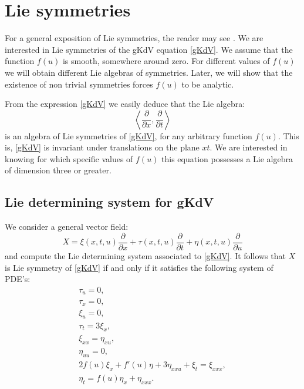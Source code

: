 \documentclass[
11pt,%
tightenlines,%
twoside,%
onecolumn,%
nofloats,%
nobibnotes,%
nofootinbib,%
superscriptaddress,%
noshowpacs,%
centertags]%
{revtex4}
\begin{document}
\section{Lie symmetries}

For a general exposition of Lie symmetries, the reader may see \cite{Bluman1974,Bluman1989,Olver1993,Stephani1989}. We are interested in Lie symmetries of the gKdV equation \eqref{gKdV}.
We assume that the function $f(u)$ is smooth, somewhere around zero. For different values of $f(u)$ we will obtain different Lie algebras of symmetries. 
Later, we will show that the existence of non trivial symmetries forces $f(u)$ to be analytic.

From the expression \eqref{gKdV} we easily deduce that the Lie algebra:
\begin{equation}
\left\langle\frac{\partial}{\partial x},\frac{\partial}{\partial t}\right\rangle
\end{equation}
is an algebra of Lie symmetries of \eqref{gKdV}, for any arbitrary function $f(u)$. This is, \eqref{gKdV}  is invariant under translations on the plane $xt$. We are interested in knowing for which specific values of  $f(u)$ this equation possesses a Lie algebra of dimension three or greater.

\subsection{Lie determining system for gKdV}

We consider a general vector field:
\begin{equation}\label{simetria}
X = \xi(x,t,u) \frac{\partial}{\partial x} + \tau(x,t,u)\frac{\partial}{\partial t} + \eta(x,t,u)\frac{\partial}{\partial u}
\end{equation}
and compute the Lie determining system associated to \eqref{gKdV}. It follows that $X$ is Lie symmetry of \eqref{gKdV} if and only if it satisfies the following system of PDE's:
\begin{eqnarray}
\tau_u = 0,\\
\tau_x = 0, \\
\xi_u = 0, \\
\tau_t = 3\xi_x,  \label{eq_tauxi} \\
\xi_{xx} = \eta_{xu},   \label{eq_xiXX} \\
\eta_{uu} = 0, \\
2f(u)\xi_x + f'(u)\eta + 3\eta_{xxu} + \xi_t = \xi_{xxx} \label{eqf_1},\\
\eta_t = f(u)\eta_x + \eta_{xxx}. \label{lineal}
\end{eqnarray}
\end{document}
